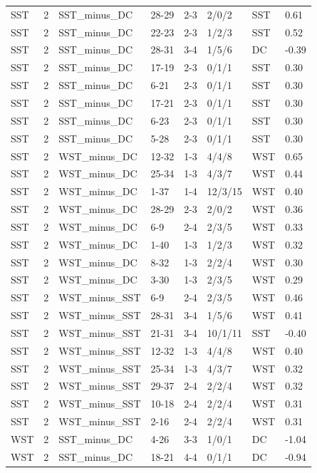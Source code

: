 \begin{table}[!h]
\begin{tabular}[t]{lrllllll}
SST & 2 & SST_minus_DC & 28-29 & 2-3 & 2/0/2 & SST & 0.61\\
SST & 2 & SST_minus_DC & 22-23 & 2-3 & 1/2/3 & SST & 0.52\\
\addlinespace
SST & 2 & SST_minus_DC & 28-31 & 3-4 & 1/5/6 & DC & -0.39\\
SST & 2 & SST_minus_DC & 17-19 & 2-3 & 0/1/1 & SST & 0.30\\
SST & 2 & SST_minus_DC & 6-21 & 2-3 & 0/1/1 & SST & 0.30\\
SST & 2 & SST_minus_DC & 17-21 & 2-3 & 0/1/1 & SST & 0.30\\
SST & 2 & SST_minus_DC & 6-23 & 2-3 & 0/1/1 & SST & 0.30\\
\addlinespace
SST & 2 & SST_minus_DC & 5-28 & 2-3 & 0/1/1 & SST & 0.30\\
SST & 2 & WST_minus_DC & 12-32 & 1-3 & 4/4/8 & WST & 0.65\\
SST & 2 & WST_minus_DC & 25-34 & 1-3 & 4/3/7 & WST & 0.44\\
SST & 2 & WST_minus_DC & 1-37 & 1-4 & 12/3/15 & WST & 0.40\\
SST & 2 & WST_minus_DC & 28-29 & 2-3 & 2/0/2 & WST & 0.36\\
\addlinespace
SST & 2 & WST_minus_DC & 6-9 & 2-4 & 2/3/5 & WST & 0.33\\
SST & 2 & WST_minus_DC & 1-40 & 1-3 & 1/2/3 & WST & 0.32\\
SST & 2 & WST_minus_DC & 8-32 & 1-3 & 2/2/4 & WST & 0.30\\
SST & 2 & WST_minus_DC & 3-30 & 1-3 & 2/3/5 & WST & 0.29\\
SST & 2 & WST_minus_SST & 6-9 & 2-4 & 2/3/5 & WST & 0.46\\
\addlinespace
SST & 2 & WST_minus_SST & 28-31 & 3-4 & 1/5/6 & WST & 0.41\\
SST & 2 & WST_minus_SST & 21-31 & 3-4 & 10/1/11 & SST & -0.40\\
SST & 2 & WST_minus_SST & 12-32 & 1-3 & 4/4/8 & WST & 0.40\\
SST & 2 & WST_minus_SST & 25-34 & 1-3 & 4/3/7 & WST & 0.32\\
SST & 2 & WST_minus_SST & 29-37 & 2-4 & 2/2/4 & WST & 0.32\\
\addlinespace
SST & 2 & WST_minus_SST & 10-18 & 2-4 & 2/2/4 & WST & 0.31\\
SST & 2 & WST_minus_SST & 2-16 & 2-4 & 2/2/4 & WST & 0.31\\
WST & 2 & SST_minus_DC & 4-26 & 3-3 & 1/0/1 & DC & -1.04\\
WST & 2 & SST_minus_DC & 18-21 & 4-4 & 0/1/1 & DC & -0.94\\

\end{tabular}
\end{table}
